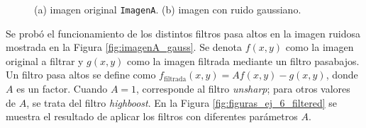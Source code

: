 \documentclass[11pt, twocolumn]{article}
\begin{document}
\begin{figure}[htbp]
  \centering
  \hfill
  \hfill
  \caption{(a) imagen original \texttt{ImagenA}. (b) imagen con ruido gaussiano.}
  \label{fig:figuras_ej_6}
\end{figure}


Se probó el funcionamiento de los distintos filtros pasa altos en la imagen ruidosa mostrada en la Figura \ref{fig:imagenA_gauss}. Se denota $f(x, y)$ como la imagen original a filtrar y $g(x, y)$ como la imagen filtrada mediante un filtro pasabajos. Un filtro pasa altos se define como $f_{\text{filtrada}}(x, y) = A f(x, y) - g(x, y)$, donde $A$ es un factor. Cuando $A=1$, corresponde al filtro \textit{unsharp}; para otros valores de $A$, se trata del filtro \textit{highboost}. En la Figura \ref{fig:figuras_ej_6_filtered} se muestra el resultado de aplicar los filtros con diferentes parámetros $A$.
\end{document}
